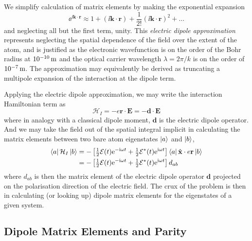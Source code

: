    We simplify calculation of matrix elements by making the exponential
   expansion
    \begin{equation}
      \ee^{\ii\mathbf{k}\cdot\mathbf{r}} \approx 1 + 
      (\ii \mathbf{k}\cdot\mathbf{r}) + 
      \frac{1}{2!} ( \ii \mathbf{k}\cdot\mathbf{r})^2 + \dots 
    \end{equation}
    and neglecting all but the first term, unity. This \textit{electric dipole
    approximation}\cite{grynberg2010introduction} represents neglecting the
    spatial dependence of the field over the extent of the atom, and is
    justified as the electronic wavefunction is on the order of the Bohr radius
    at $\unit[10^{-10}]{m}$ and the optical carrier wavelength $\lambda =
    2\pi/k$ is on the order of $\unit[10^{-7}]{m}$. The approximation may
    equivalently be derived as truncating a multipole expansion of the
    interaction at the dipole term.\cite{cohen1992atom}

    Applying the electric dipole approximation, we may write the interaction Hamiltonian term as 
    \begin{equation}
      \mathcal{H}_I = -e \mathbf{r} \cdot \mathbf{E} 
                    = -\mathbf{d} \cdot \mathbf{E}
    \end{equation}
    where in analogy with a classical dipole moment, $\mathbf{d}$ is the
    electric dipole operator. And we may take the field out of the spatial
    integral implicit in calculating the matrix elements between two bare atom
    eigenstates $\Ket{a}$ and $\Ket{b}$,
    \begin{align}
      \Bra{a} \mathcal{H}_I \Ket{b} &= -
        \left [ \tfrac{1}{2} \mathcal{E}(t) 
        \mathrm{e}^{- \mathrm{i} \omega t} +
        \tfrac{1}{2} \mathcal{E}^*(t) \mathrm{e}^{\mathrm{i} \omega t} \right]
        \Bra{a} \hat{\mathbf{x}} \cdot e \mathbf{r}
        \Ket{b} \nonumber \\
        &= - \left [ \tfrac{1}{2} \mathcal{E}(t) 
        \mathrm{e}^{- \mathrm{i} \omega t} +
        \tfrac{1}{2} \mathcal{E}^*(t) \mathrm{e}^{\mathrm{i} \omega t} \right] 
        d_{ab}
    \end{align}
    where $ d_{ab}$ is then the matrix element of the electric dipole operator
    $\mathbf{d}$ projected on the polarisation direction of the electric field.
    The crux of the problem is then in calculating (or looking up) dipole matrix
    elements for the eigenstates of a given system.

  \subsection{Dipole Matrix Elements and Parity}

